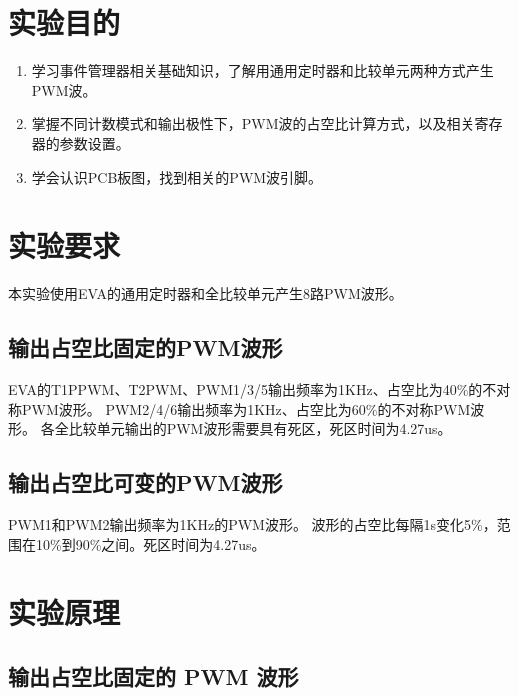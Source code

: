 \documentclass{math201}
\begin{document}

\makecover


\section{实验目的}

\begin{enumerate}
  \item 学习事件管理器相关基础知识，了解用通用定时器和比较单元两种方式产生PWM波。
  \item 掌握不同计数模式和输出极性下，PWM波的占空比计算方式，以及相关寄存器的参数设置。
  \item 学会认识PCB板图，找到相关的PWM波引脚。
\end{enumerate}

\section{实验要求}

本实验使用EVA的通用定时器和全比较单元产生8路PWM波形。

\subsection{输出占空比固定的PWM波形}

EVA的T1PPWM、T2PWM、PWM1/3/5输出频率为1KHz、占空比为40\%的不对称PWM波形。
PWM2/4/6输出频率为1KHz、占空比为60\%的不对称PWM波形。
各全比较单元输出的PWM波形需要具有死区，死区时间为4.27us。

\subsection{输出占空比可变的PWM波形}

PWM1和PWM2输出频率为1KHz的PWM波形。
波形的占空比每隔1s变化5\%，范围在10\%到90\%之间。死区时间为4.27us。

\section{实验原理}

\subsection{输出占空比固定的 PWM 波形}
\end{document}
